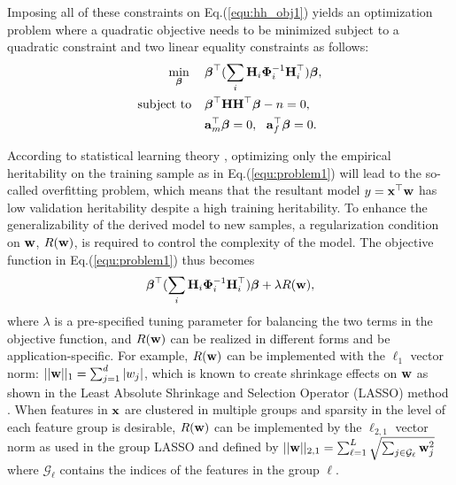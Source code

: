 \documentclass[10pt,letterpaper]{article}
\newcommand{\matrx}[1]{\ensuremath\boldsymbol{\rm #1}}
\newcommand{\vect}[1]{\ensuremath\boldsymbol{\rm #1}}
\begin{document}
Imposing all of these constraints on Eq.(\ref{equ:hh_obj1}) yields an optimization problem where a quadratic objective needs to be minimized subject to a quadratic constraint and two linear equality constraints as follows: 
\begin{equation}
\label{equ:problem1}
\begin{split}
\min_{\vect \beta} \phantom{aa} & \vect \beta^\top (\sum_i \matrx H_i \matrx \Phi_i^{-1} \matrx H_i^\top)\vect \beta,  \\
\mbox{subject to} \phantom{aa} & \vect \beta^\top \matrx H \matrx H^\top \vect \beta - n = 0,  \\
                               & \vect a_m^\top \vect \beta = 0,~~\vect a_f^\top \vect \beta = 0.
\end{split}
\end{equation}

According to statistical learning theory \cite{Vapnik:1999:learning_theroy}, optimizing only the empirical heritability on the training sample as in Eq.(\ref{equ:problem1}) will lead to the so-called overfitting problem, which means that the resultant model $y = \vect x ^\top \vect w$ has low validation heritability despite a high training heritability. To enhance the generalizability of the derived model to new samples, a regularization condition on $\vect w$, $R(\vect w)$, is required to control the complexity of the model. The objective function in Eq.(\ref{equ:problem1}) thus becomes
\begin{equation}
\label{equ:problem2}
\begin{split}
\vect \beta^\top (\sum_i \matrx H_i \matrx \Phi_i^{-1} \matrx H_i^\top)\vect \beta + \lambda R(\vect w), \\
\end{split}
\end{equation}
where $\lambda$ is a pre-specified tuning parameter for balancing the two terms in the objective function, and $R(\vect w)$ can be realized in different forms and be application-specific. For example, $R(\vect w)$ can be implemented with the $\ell_1$ vector norm: $||\vect w||_1 = \sum_{j=1}^d |w_j|$, which is known to create shrinkage effects on $\vect w$ as shown in the Least Absolute Shrinkage and Selection Operator (LASSO) method \cite{tibshirani:1996}. When features in $\vect x$ are clustered in multiple groups and sparsity in the level of each feature group is desirable, $R(\vect w)$ can be implemented by the $\ell_{2,1}$ vector norm as used in the group LASSO \cite{Meier:groupLASSO:2008} and defined by $
||\vect w||_{2,1} = \sum_{\ell=1}^L \sqrt{\sum_{j \in \mathcal{G_{\ell}}} \vect w_j^2}$
where $\mathcal{G_{\ell}}$ contains the indices of the features in the group $\ell$. 
\end{document}
